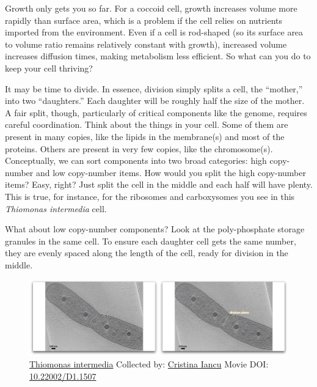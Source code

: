 \documentclass[]{tufte-book}
\begin{document}
Growth only gets you so far. For a coccoid cell, growth increases volume
more rapidly than surface area, which is a problem if the cell relies on
nutrients imported from the environment. Even if a cell is rod-shaped
(so its surface area to volume ratio remains relatively constant with
growth), increased volume increases diffusion times, making metabolism
less efficient. So what can you do to keep your cell thriving?

It may be time to divide. In essence, division simply splits a cell, the
``mother,'' into two ``daughters.'' Each daughter will be roughly half
the size of the mother. A fair split, though, particularly of critical
components like the genome, requires careful coordination. Think about
the things in your cell. Some of them are present in many copies, like
the lipids in the membrane(s) and most of the proteins. Others are
present in very few copies, like the chromosome(s). Conceptually, we can
sort components into two broad categories: high copy-number and low
copy-number items. How would you split the high copy-number items? Easy,
right? Just split the cell in the middle and each half will have plenty.
This is true, for instance, for the ribosomes and carboxysomes you see
in this \emph{Thiomonas intermedia} cell.

What about low copy-number components? Look at the poly-phosphate
storage granules in the same cell. To ensure each daughter cell gets the
same number, they are evenly spaced along the length of the cell, ready
for division in the middle.





\begin{figure}
\includegraphics{movie_stills/5_1} \caption[\protect\hyperlink{tree}{Thiomonas intermedia} Collected by:
\protect\hyperlink{cristina_iancu}{Cristina Iancu} Movie DOI:
\href{https://doi.org/10.22002/D1.1507}{10.22002/D1.1507}]{\protect\hyperlink{tree}{Thiomonas intermedia} Collected by:
\protect\hyperlink{cristina_iancu}{Cristina Iancu} Movie DOI:
\href{https://doi.org/10.22002/D1.1507}{10.22002/D1.1507}}\label{fig:5-1}
\end{figure}
\end{document}
